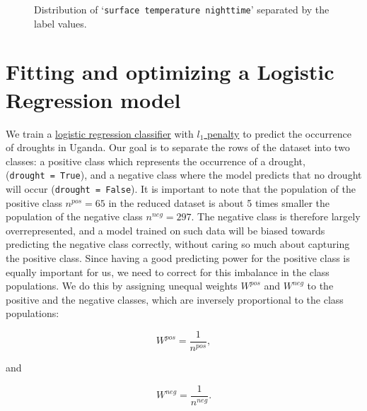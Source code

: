 \documentclass[10pt,parskip=half,
toc=sectionentrywithdots,
bibliography=totocnumbered,
captions=tableheading,numbers=noendperiod]{scrartcl}
\begin{document}
\begin{figure}[H]\begin{center}\end{center}\caption{Distribution of `\texttt{surface\ temperature\ nighttime}' separated by
the label values.}\label{fig_dist19}\end{figure}

\hypertarget{fitting-and-optimizing-a-logistic-regression-model}{%
\section{Fitting and optimizing a Logistic Regression
model}\label{fitting-and-optimizing-a-logistic-regression-model}}

We train a
\href{https://scikit-learn.org/stable/modules/generated/sklearn.linear_model.LogisticRegression.html}{logistic
regression classifier} with
\href{https://scikit-learn.org/stable/auto_examples/linear_model/plot_logistic_l1_l2_sparsity.html}{\(l_1\)
penalty} to predict the occurrence of droughts in Uganda. Our goal is to
separate the rows of the dataset into two classes: a positive class
which represents the occurrence of a drought,
(\texttt{drought\ =\ True}), and a negative class where the model
predicts that no drought will occur (\texttt{drought\ =\ False}). It is
important to note that the population of the positive class
\(n^{pos}= 65\) in the reduced dataset is about 5 times smaller the
population of the negative class \(n^{neg}= 297\). The negative class is
therefore largely overrepresented, and a model trained on such data will
be biased towards predicting the negative class correctly, without
caring so much about capturing the positive class. Since having a good
predicting power for the positive class is equally important for us, we
need to correct for this imbalance in the class populations. We do this
by assigning unequal weights \(W^{pos}\) and \(W^{neg}\) to the positive
and the negative classes, which are inversely proportional to the class
populations:

\begin{equation}\label{eqn_wpos}
W^{pos}=\frac{1}{n^{pos}},
\end{equation}

and

\begin{equation}\label{eqn_wneg}
W^{neg}=\frac{1}{n^{neg}}.
\end{equation}
\end{document}
